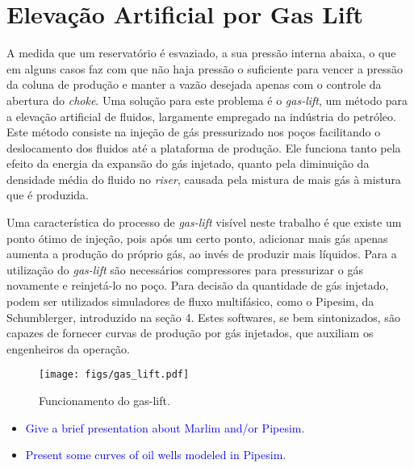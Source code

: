\section{Elevação Artificial por Gas Lift}

A medida que um reservatório é esvaziado, a sua pressão interna abaixa, o que em alguns casos faz com que não haja pressão o suficiente para vencer a pressão da coluna de produção e manter a vazão desejada  apenas com o controle da abertura do \textit{choke}.
%
Uma solução para este problema é o \textit{gas-lift}, um método para a elevação artificial de fluidos, largamente empregado na indústria do petróleo.
%
Este método consiste na injeção de gás pressurizado nos poços facilitando o deslocamento dos fluidos até a plataforma de produção. 
%
Ele funciona tanto pela efeito da energia da expansão do gás injetado, quanto pela diminuição da densidade média do fluido no \textit{riser}, causada pela mistura de mais gás à mistura que é produzida.
%



Uma característica do processo de \textit{gas-lift} visível neste trabalho é que existe um ponto ótimo de injeção, pois após um certo ponto, adicionar mais gás apenas aumenta a produção do próprio gás, ao invés de produzir mais líquidos.
%
Para a utilização do \textit{gas-lift} são necessários compressores para pressurizar o gás novamente e reinjetá-lo no poço.
%
Para decisão da quantidade de gás injetado, podem ser utilizados simuladores de fluxo multifásico, como o Pipesim, da Schumblerger, introduzido na seção 4. Estes softwares, se bem sintonizados, são capazes de fornecer curvas de produção por gás injetados, que auxiliam os engenheiros da operação.



\begin{figure}
\centering
	  \texttt{[image: figs/gas\_lift.pdf]}
  \caption{Funcionamento do gas-lift.}
  \label{fig:setup3_triang}
\end{figure}



\begin{itemize}

\item \textcolor{blue}{Give a brief presentation about Marlim and/or Pipesim.}

\item \textcolor{blue}{Present some curves of oil wells modeled in Pipesim.}


\end{itemize}
